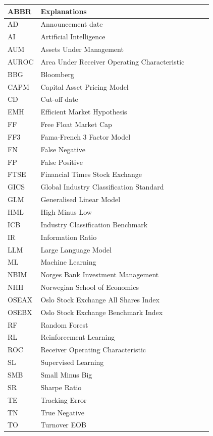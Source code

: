 \begin{table}[H]
\centering
\begin{tabularx}{\columnwidth}{lXlXl}
\toprule
ABBR & Explanations\\ 
\midrule
AD & Announcement date\\ 
AI & Artificial Intelligence \\
AUM & Assets Under Management \\
AUROC & Area Under Receiver Operating Characteristic \\
BBG & Bloomberg \\
CAPM & Capital Asset Pricing Model \\
CD & Cut-off date \\
EMH & Efficient Market Hypothesis \\
FF & Free Float Market Cap \\
FF3 & Fama-French 3 Factor Model \\
FN & False Negative \\
FP & False Positive \\
FTSE & Financial Times Stock Exchange \\
GICS & Global Industry Classification Standard \\
GLM & Generalised Linear Model \\
HML & High Minus Low \\
ICB & Industry Classification Benchmark \\
IR & Information Ratio \\
LLM & Large Language Model \\
ML & Machine Learning \\
NBIM & Norges Bank Investment Management\\ 
NHH & Norwegian School of Economics\\
OSEAX & Oslo Stock Exchange All Shares Index\\
OSEBX & Oslo Stock Exchange Benchmark Index\\
RF & Random Forest \\
RL & Reinforcement Learning \\
ROC & Receiver Operating Characteristic \\
SL & Supervised Learning \\
SMB & Small Minus Big \\
SR & Sharpe Ratio \\
TE & Tracking Error \\
TN & True Negative \\
TO & Turnover EOB \\

\end{tabularx}
\end{table}
